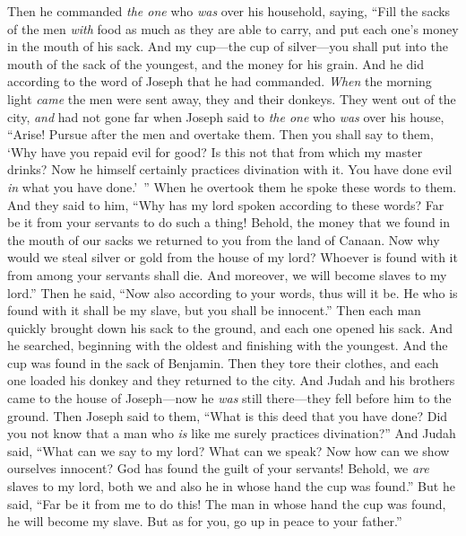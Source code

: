 \begin{biblechapter} %
 Then he commanded \textit{the one} who \textit{was} over his household, saying, “Fill the sacks of the men \textit{with} food as much as they are able to carry, and put each one’s money in the mouth of his sack.
\verse And my cup—the cup of silver—you shall put into the mouth of the sack of the youngest, and the money for his grain. And he did according to the word of Joseph that he had commanded.
\verse \textit{When} the morning light \textit{came} the men were sent away, they and their donkeys.
\verse They went out of the city, \textit{and} had not gone far when Joseph said to \textit{the one} who \textit{was} over his house, “Arise! Pursue after the men and overtake them. Then you shall say to them, ‘Why have you repaid evil for good?
\verse Is this not that from which my master drinks? Now he himself certainly practices divination with it. You have done evil \textit{in} what you have done.’ ”
\verse When he overtook them he spoke these words to them.
\verse And they said to him, “Why has my lord spoken according to these words? Far be it from your servants to do such a thing!
\verse Behold, the money that we found in the mouth of our sacks we returned to you from the land of Canaan. Now why would we steal silver or gold from the house of my lord?
\verse Whoever is found with it from among your servants shall die. And moreover, we will become slaves to my lord.”
\verse Then he said, “Now also according to your words, thus will it be. He who is found with it shall be my slave, but you shall be innocent.”
\verse Then each man quickly brought down his sack to the ground, and each one opened his sack.
\verse And he searched, beginning with the oldest and finishing with the youngest. And the cup was found in the sack of Benjamin.
\verse Then they tore their clothes, and each one loaded his donkey and they returned to the city.
\verse And Judah and his brothers came to the house of Joseph—now he \textit{was} still there—they fell before him to the ground.
\verse Then Joseph said to them, “What is this deed that you have done? Did you not know that a man who \textit{is} like me surely practices divination?”
\verse And Judah said, “What can we say to my lord? What can we speak? Now how can we show ourselves innocent? God has found the guilt of your servants! Behold, we \textit{are} slaves to my lord, both we and also he in whose hand the cup was found.”
\verse But he said, “Far be it from me to do this! The man in whose hand the cup was found, he will become my slave. But as for you, go up in peace to your father.”

\end{biblechapter}
